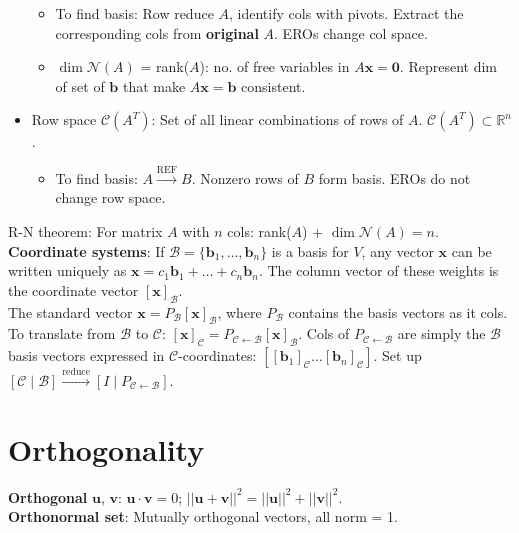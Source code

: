 \documentclass[10pt]{article}
\begin{document}
\begin{multicols*}{2}
\begin{itemize}
    \begin{itemize}
        \item To find basis: Row reduce $A$, identify cols with pivots. Extract the corresponding cols from \textbf{original} $A$. EROs change col space.
        \item $\dim \mathcal{N}(A)$ = rank($A$): no. of free variables in $A\mathbf{x}=\mathbf{0}$. Represent dim of set of $\mathbf{b}$ that make $A\mathbf{x}=\mathbf{b}$ consistent.
    \end{itemize}
    \item Row space $\mathcal{C}(A^T)$: Set of all linear combinations of rows of $A$. $\mathcal{C}(A^T)\subset \mathbb{R}^n$.
    \begin{itemize}
        \item To find basis: $A\xrightarrow{\text{REF}}B$. Nonzero rows of $B$ form basis. EROs do not change row space.
    \end{itemize}
\end{itemize}
R-N theorem: For matrix $A$ with $n$ cols: rank($A$) + $\dim \mathcal{N}(A) = n$.\\
\textbf{Coordinate systems}: If $\mathcal{B} = \{\mathbf{b}_1, \dots, \mathbf{b}_n\}$ is a basis for $V$, any vector $\mathbf{x}$ can be written uniquely as $\mathbf{x} = c_1\mathbf{b}_1 + \dots + c_n\mathbf{b}_n$. The column vector of these weights is the coordinate vector $[\mathbf{x}]_\mathcal{B}$.\\
The standard vector $\mathbf{x} = P_\mathcal{B}[\mathbf{x}]_\mathcal{B}$, where $P_\mathcal{B}$ contains the basis vectors as it cols.\\
To translate from $\mathcal{B}$ to $\mathcal{C}$: $[\mathbf{x}]_\mathcal{C} = P_{\mathcal{C} \leftarrow \mathcal{B}} [\mathbf{x}]_\mathcal{B}$.
Cols of $P_{\mathcal{C} \leftarrow \mathcal{B}}$ are simply the $\mathcal{B}$ basis vectors expressed in $\mathcal{C}$-coordinates: $[ [\mathbf{b}_1]_\mathcal{C} \dots [\mathbf{b}_n]_\mathcal{C} ]$. Set up $[\mathcal{C} \mid \mathcal{B}] \xrightarrow{\text{reduce}} [I \mid P_{\mathcal{C} \leftarrow \mathcal{B}}]$.


\section*{Orthogonality}
\textbf{Orthogonal} $\mathbf{u}$, $\mathbf{v}$: $\mathbf{u} \cdot \mathbf{v} = 0$; $||\mathbf{u}+\mathbf{v}||^2 = ||\mathbf{u}||^2 + ||\mathbf{v}||^2$.\\
\textbf{Orthonormal set}: Mutually orthogonal vectors, all norm = 1.\\


\end{multicols*}
\end{document}
